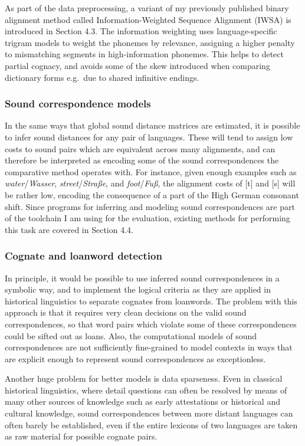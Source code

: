 As part of the data preprocessing, a variant of my previously published binary alignment method called Information-Weighted Sequence Alignment (IWSA) is introduced in Section 4.3. The information weighting uses language-specific trigram models to weight the phonemes by relevance, assigning a higher penalty to mismatching segments in high-information phonemes. This helps to detect partial cognacy, and avoids some of the skew introduced when comparing dictionary forms e.g.\ due to shared infinitive endings.

\subsubsection{Sound correspondence models}
In the same ways that global sound distance matrices are estimated, it is possible to infer sound distances for any pair of languages. These will tend to assign low costs to sound pairs which are equivalent across many alignments, and can therefore be interpreted as encoding some of the sound correspondences the comparative method operates with. For instance, given enough examples such as \textit{water}/\textit{Wasser}, \textit{street}/\textit{Stra\ss{}e}, and \textit{foot}/\textit{Fu\ss{}}, the alignment costs of  [t] and  [s] will be rather low, encoding the consequence of a part of the High German consonant shift. Since programs for inferring and modeling sound correspondences are part of the toolchain I am using for the evaluation, existing methods for performing this task are covered in Section 4.4.

\subsubsection{Cognate and loanword detection}
In principle, it would be possible to use inferred sound correspondences in a symbolic way, and to implement the logical criteria as they are applied in historical linguistics to separate cognates from loanwords. The problem with this approach is that it requires very clean decisions on the valid sound correspondences, so that word pairs which violate some of these correspondences could be sifted out as loans. Also, the computational models of sound correspondences are not sufficiently fine-grained to model contexts in ways that are explicit enough to represent sound correspondences as exceptionless.

Another huge problem for better models is data sparseness. Even in classical historical linguistics, where detail questions can often be resolved by means of many other sources of knowledge such as early attestations or historical and cultural knowledge, sound correspondences between more distant languages can often barely be established, even if the entire lexicons of two languages are taken as raw material for possible cognate pairs.

